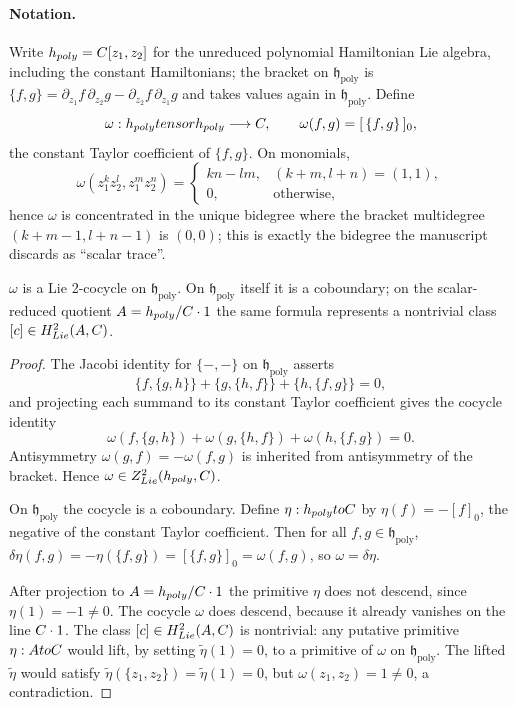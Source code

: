 \documentclass[11pt]{memoir}
\begin{document}
\paragraph{Notation.} Write $h_{poly}=C[z_1,z_2]$ for
the unreduced polynomial Hamiltonian Lie algebra, including the constant
Hamiltonians; the bracket on $\mathfrak h_{\mathrm{poly}}$ is
$\{f,g\}=\partial_{z_1}f\,\partial_{z_2}g-\partial_{z_2}f\,\partial_{z_1}g$ and
takes values again in $\mathfrak h_{\mathrm{poly}}$. Define
$$\omega:h_{poly}tensorh_{poly}
  \longrightarrow C,\qquad
  \omega(f,g)=[\,\{f,g\}\,]_0,$$
the constant Taylor coefficient of $\{f,g\}$. On monomials,
$$\omega(z_1^kz_2^l,z_1^mz_2^n)=
  \begin{cases}
    kn-lm, & (k+m,l+n)=(1,1),\\
    0, & \text{otherwise},
  \end{cases}$$
hence $\omega$ is concentrated in the unique bidegree where the bracket
multidegree $(k+m-1,l+n-1)$ is $(0,0)$; this is exactly the bidegree the
manuscript discards as ``scalar trace''.

\begin{lem}\label{lem:omega-cocycle}
  $\omega$ is a Lie 2-cocycle on $\mathfrak h_{\mathrm{poly}}$.  On
  $\mathfrak h_{\mathrm{poly}}$ itself it is a coboundary; on the
  scalar-reduced quotient $A=h_{poly}/C\cdot 1$
  the same formula represents a nontrivial class
  $[c]\in H^2_{Lie}(A,C)$.
\end{lem}

\begin{proof}
  The Jacobi identity for $\{-,-\}$ on $\mathfrak h_{\mathrm{poly}}$ asserts
  $$\{f,\{g,h\}\}+\{g,\{h,f\}\}+\{h,\{f,g\}\}=0,$$
  and projecting each summand to its constant Taylor coefficient gives the
  cocycle identity
  $$\omega(f,\{g,h\})+\omega(g,\{h,f\})+\omega(h,\{f,g\})=0.$$
  Antisymmetry $\omega(g,f)=-\omega(f,g)$ is inherited from antisymmetry of
  the bracket. Hence $\omega\in Z^2_{Lie}(h_{poly},C)$.

  On $\mathfrak h_{\mathrm{poly}}$ the cocycle is a coboundary. Define
  $\eta:h_{poly}toC$ by $\eta(f)=-[f]_0$, the
  negative of the constant Taylor coefficient. Then for all
  $f,g\in\mathfrak h_{\mathrm{poly}}$,
  $\delta\eta(f,g)=-\eta(\{f,g\})=[\{f,g\}]_0=\omega(f,g)$, so $\omega=\delta\eta$.

  After projection to $A=h_{poly}/C\cdot 1$ the
  primitive $\eta$ does not descend, since $\eta(1)=-1\neq 0$. The
  cocycle $\omega$ does descend, because it already vanishes on the line
  $C\cdot 1$. The class $[c]\in H^2_{Lie}(A,C)$ is
  nontrivial: any putative primitive $\eta:AtoC$ would lift,
  by setting $\tilde\eta(1)=0$, to a primitive of $\omega$ on
  $\mathfrak h_{\mathrm{poly}}$. The lifted $\tilde\eta$ would satisfy
  $\tilde\eta(\{z_1,z_2\})=\tilde\eta(1)=0$, but
  $\omega(z_1,z_2)=1\neq 0$, a contradiction.
\end{proof}
\end{document}
